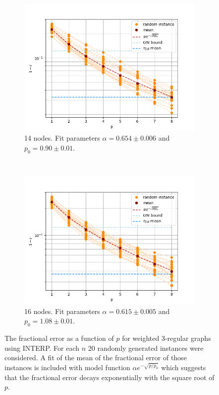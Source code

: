 \begin{figure}[H]
	\centering
	\begin{subfigure}[t]{0.45\textwidth}
		\centering
		\includegraphics[width=\textwidth]{figures/interp/FOM_(weighted)/SQR/FOM_3-regular-14-nodal_sqr}
		\caption{14 nodes. Fit parameters $\alpha = 0.654 \pm 0.006$ and $p_0 = 0.90 \pm 0.01$.}
	\end{subfigure}
	~
	\begin{subfigure}[t]{0.45\textwidth}
		\centering
		\includegraphics[width=\textwidth]{figures/interp/FOM_(weighted)/SQR/FOM_3-regular-16-nodal_sqr}
		\caption{16 nodes. Fit parameters $\alpha = 0.615 \pm 0.005$ and $p_0 = 1.08 \pm 0.01$.}
	\end{subfigure}
	\caption{The fractional error as a function of $p$ for weighted 3-regular graphs using INTERP. For each $n$ 20 randomly generated instances were considered. A fit of the mean of the fractional error of those instances is included with model function $\alpha e^{-\sqrt{p/p_0}}$ which suggests that the fractional error decays exponentially with the square root of $p$.}
\end{figure}

